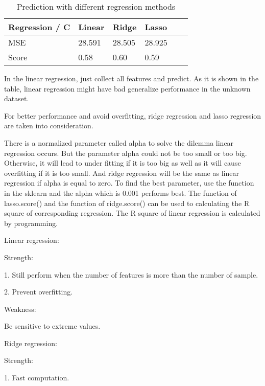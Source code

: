 \documentclass[letterpaper, 10 pt, conference]{ieeeconf}  %
\begin{document}
\begin{table}[htb]
	\caption{Prediction with different regression methods}  
	\begin{center}  
		\begin{tabu} to 1\textwidth{X[3,c]|X[1,b]|X[2,l]|X[3,c]|X[2,m]|X[1,c]}  
			\hline  
			Regression / C  &Linear             &Ridge      &Lasso\\  
			\hline  
			MSE    &28.591      &28.505          &28.925\\  
			Score   &0.58      &0.60           &0.59\\  
			\hline  
		\end{tabu}  
	\end{center}  
\end{table} 

In the linear regression, just collect all features and predict. As it is shown in the table, linear regression might have bad generalize performance in the unknown dataset.

For better performance and avoid overfitting, ridge regression and lasso regression are taken into consideration.

There is a normalized parameter called alpha to solve the dilemma linear regression occurs. But the parameter alpha could not be too small or too big. Otherwise, it will lead to under fitting if it is too big as well as it will cause overfitting if it is too small. 
And ridge regression will be the same as linear regression if alpha is equal to zero.
To find the best parameter, use the function in the sklearn and the alpha which is 0.001 performs best.
The function of lasso.score() and the function of ridge.score() can be used to calculating the R square of corresponding regression. The R square of linear regression is calculated by programming.

Linear regression:

Strength:

1. Still perform when the number of features is more than the number of sample.

2. Prevent overfitting.

Weakness:

Be sensitive to extreme values.

Ridge regression:

Strength:

1. Fast computation.
\end{document}
